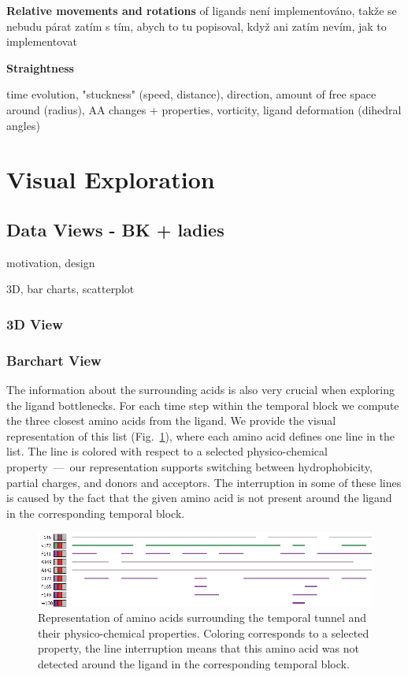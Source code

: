 \documentclass[twocolumn]{bmcart}%
\begin{document}
\begin{itemize}
{\color{red}\item \textbf{Relative movements and rotations} of ligands není implementováno, takže se nebudu párat zatím s tím, abych to tu popisoval, když ani zatím nevím, jak to implementovat} 

\item \textbf{Straightness} 

\end{itemize}


time evolution, "stuckness" (speed, distance), direction, amount of free space around (radius), AA changes + properties, vorticity, ligand deformation (dihedral angles)

\section*{Visual Exploration}
\subsection*{Data Views - BK + ladies}
motivation, design

3D, bar charts, scatterplot

\subsubsection*{3D View}

\subsubsection*{Barchart View}


The information about the surrounding acids is also very crucial when exploring the ligand bottlenecks. 
For each time step within the temporal block we compute the three closest amino acids from the ligand. 
We provide the visual representation of this list (Fig.~\ref{fig:aacids}), where each amino acid defines one line in the list. 
The line is colored with respect to a selected physico-chemical property~---~our representation supports switching between hydrophobicity, partial charges, and donors and acceptors.
The interruption in some of these lines is caused by the fact that the given amino acid is not present around the ligand in the corresponding temporal block.

\begin{figure}[htb]
	\centering
  \includegraphics[width=0.95\linewidth]{img/aacids.png}
  \caption{\label{fig:aacids} Representation of amino acids surrounding the temporal tunnel and their physico-chemical properties. Coloring corresponds to a selected property, the line interruption means that this amino acid was not detected around the ligand in the corresponding temporal block.}
\end{figure}
\end{document}
